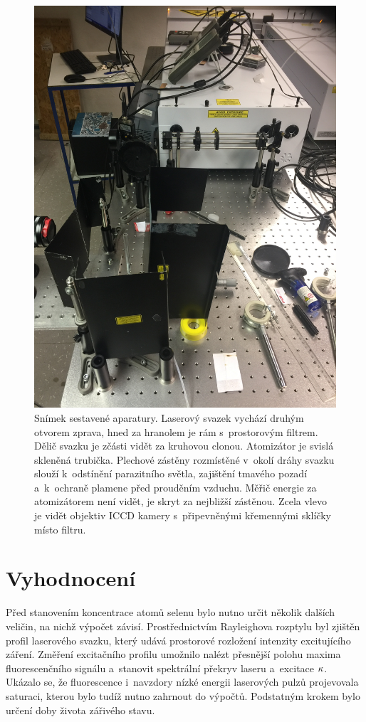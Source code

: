\begin{figure}[htp]
	\centering
	\includegraphics[width=\textwidth, trim={0 24 0 0}, clip]
		{img/lif-setup-photo-1}
	\caption{Snímek sestavené aparatury.
		Laserový svazek vychází druhým otvorem zprava,
		hned za hranolem je rám s~prostorovým filtrem.
		Dělič svazku je zčásti vidět za kruhovou clonou.
		Atomizátor je svislá skleněná trubička.
		Plechové zástěny rozmístěné v~okolí dráhy svazku
		slouží k~odstínění parazitního světla,
		zajištění tmavého pozadí a~k~ochraně plamene před prouděním vzduchu.
		Měřič energie za atomizátorem není vidět, je skryt za nejbližší
		zástěnou.
		Zcela vlevo je vidět objektiv ICCD kamery s~připevněnými
		křemennými sklíčky místo filtru.}%
	\label{fig:lif-setup-photo}
\end{figure}

\section{Vyhodnocení}
\label{sec:lif-method}
Před stanovením koncentrace atomů selenu bylo nutno určit několik
dalších veličin, na nichž výpočet závisí.
Prostřednictvím Rayleighova rozptylu byl zjištěn profil laserového svazku,
který udává prostorové rozložení intenzity excitujícího záření.
Změření excitačního profilu umožnilo nalézt přesnější polohu maxima
fluorescenčního signálu
a~stanovit spektrální překryv laseru a~excitace $\kappa$.
Ukázalo se, že fluorescence i~navzdory nízké energii laserových pulzů
projevovala saturaci, kterou bylo tudíž nutno zahrnout do výpočtů.
Podstatným krokem bylo určení doby života zářivého stavu.


